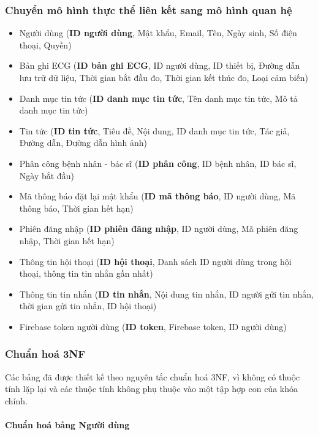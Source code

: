 \subsubsection{Chuyển mô hình thực thể liên kết sang mô hình quan hệ}

\begin{itemize}
  \item Người dùng (\textbf{ID người dùng}, Mật khẩu, Email, Tên, Ngày sinh, Số điện thoại, Quyền)
  \item Bản ghi ECG (\textbf{ID bản ghi ECG}, ID người dùng, ID thiết bị, Đường dẫn lưu trữ dữ liệu, Thời gian bắt đầu đo, Thời gian kết thúc đo, Loại cảm biến)
  \item Danh mục tin tức (\textbf{ID danh mục tin tức}, Tên danh mục tin tức, Mô tả danh mục tin tức)
  \item Tin tức (\textbf{ID tin tức}, Tiêu đề, Nội dung, ID danh mục tin tức, Tác giả, Đường dẫn, Đường dẫn hình ảnh)
  \item Phân công bệnh nhân - bác sĩ (\textbf{ID phân công}, ID bệnh nhân, ID bác sĩ, Ngày bắt đầu)
  \item Mã thông báo đặt lại mật khẩu (\textbf{ID mã thông báo}, ID người dùng, Mã thông báo, Thời gian hết hạn)
  \item Phiên đăng nhập (\textbf{ID phiên đăng nhập}, ID người dùng, Mã phiên đăng nhập, Thời gian hết hạn)
  \item Thông tin hội thoại (\textbf{ID hội thoại}, Danh sách ID người dùng trong hội thoại, thông tin tin nhắn gần nhất)
  \item Thông tin tin nhắn (\textbf{ID tin nhắn}, Nội dung tin nhắn, ID người gửi tin nhắn, thời gian gửi tin nhắn, ID hội thoại)
  \item Firebase token người dùng (\textbf{ID token}, Firebase token, ID người dùng)
\end{itemize}


\subsubsection{Chuẩn hoá 3NF}
Các bảng đã được thiết kế theo nguyên tắc chuẩn hoá 3NF, vì không có thuộc tính lặp lại và các thuộc tính không phụ thuộc vào một tập hợp con của khóa chính.

\paragraph{Chuẩn hoá bảng Người dùng}
\mbox{}

